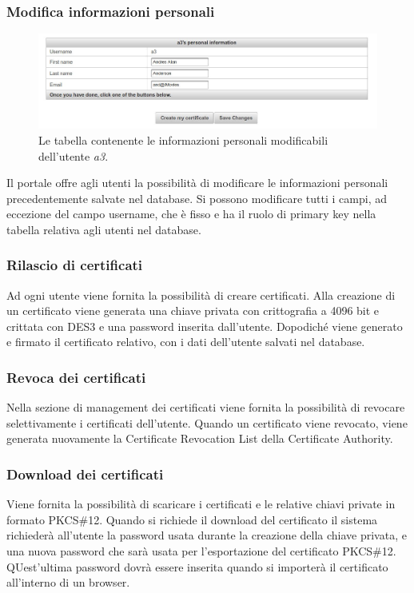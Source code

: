 \documentclass{article}
\begin{document}
\subsubsection*{Modifica informazioni personali}
\begin{figure}[h!]
\centering
\includegraphics[width=\textwidth]{img/edit}
\caption{Le tabella contenente le informazioni personali modificabili dell'utente \emph{a3}.}
\end{figure}
Il portale offre agli utenti la possibilità di modificare le informazioni personali precedentemente salvate nel database. Si possono modificare tutti i campi, ad eccezione del campo username, che è fisso e ha il ruolo di primary key nella tabella relativa agli utenti nel database.
\subsubsection*{Rilascio di certificati}
Ad ogni utente viene fornita la possibilità di creare certificati. Alla creazione di un certificato viene generata una chiave privata con crittografia a 4096 bit e crittata con DES3 e una password inserita dall'utente. Dopodiché viene generato e firmato il certificato relativo, con i dati dell'utente salvati nel database.
\subsubsection*{Revoca dei certificati}
Nella sezione di management dei certificati viene fornita la possibilità di revocare selettivamente i certificati dell'utente. Quando un certificato viene revocato, viene generata nuovamente la Certificate Revocation List della Certificate Authority.
\subsubsection*{Download dei certificati}
Viene fornita la possibilità di scaricare i certificati e le relative chiavi private in formato PKCS\#12. Quando si richiede il download del certificato il sistema richiederà all'utente la password usata durante la creazione della chiave privata, e una nuova password che sarà usata per l'esportazione del certificato PKCS\#12. QUest'ultima password dovrà essere inserita quando si importerà il certificato all'interno di un browser.
\end{document}

